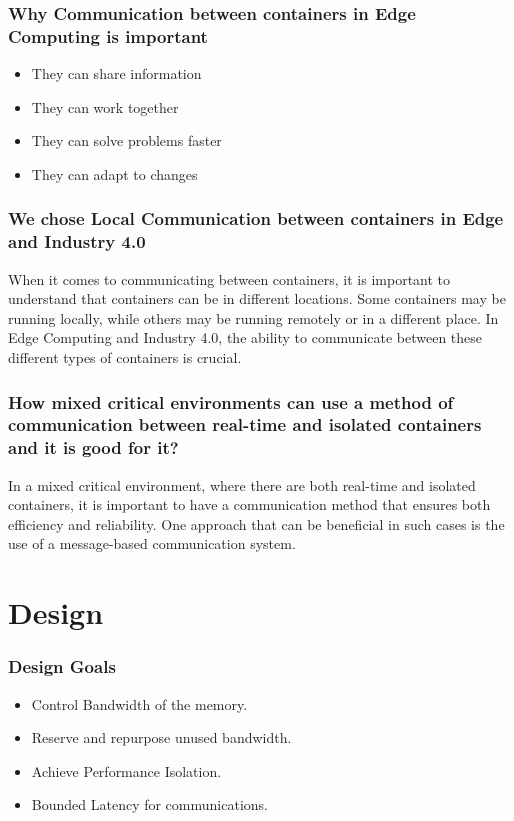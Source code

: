 \documentclass{beamer}
\begin{document}
\begin{frame}
    \frametitle{Why Communication between containers in Edge Computing is important }
    \begin{itemize}
    	\item They can share information
    	\item They can work together
    	\item They can solve problems faster
    	\item They can adapt to changes
    \end{itemize}
\end{frame}

\begin{frame}
    \frametitle{We chose Local Communication between containers in Edge and Industry 4.0}
     When it comes to communicating between containers, it is important to
     understand that containers can be in different locations.
     Some containers may be running locally, while others may be running
     remotely or in a different place. In Edge Computing and Industry 4.0,
     the ability to communicate between these different types of containers
     is crucial.
\end{frame}

\begin{frame}
    \frametitle{How mixed critical environments can use a method of
    communication between real-time and isolated containers and it is good for it?}
    In a mixed critical environment, where there are both real-time
    and isolated containers, it is important to have a communication
    method that ensures both efficiency and reliability. One approach
    that can be beneficial in such cases is the use of a message-based
    communication system.
\end{frame}

\section{Design}

\begin{frame}
    \frametitle{Design Goals}
    \begin{itemize}
        \item Control Bandwidth of the memory.
        \item Reserve and repurpose unused bandwidth.
        \item Achieve Performance Isolation.
        \item Bounded Latency for communications.
    \end{itemize}
\end{frame}
\end{document}
